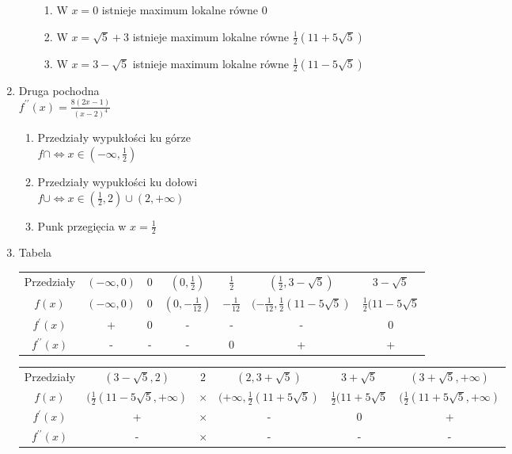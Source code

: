 \documentclass[11pt]{scrartcl}
\begin{document}
\begin{enumerate}
\begin{enumerate}
\begin{enumerate}
					\item W $ x = 0 $ istnieje maximum lokalne równe $ 0 $
					\item W $ x = \sqrt{5} + 3 $ istnieje maximum lokalne równe $ \frac{1}{2}(11 + 5\sqrt{5}) $
					\item W $ x = 3 - \sqrt{5} $ istnieje maximum lokalne równe $ \frac{1}{2}(11 - 5\sqrt{5}) $
				\end{enumerate}
			\end{enumerate}
		\item Druga pochodna \\
			$ f^{\prime\prime}(x) = \frac{8(2x-1)}{(x-2)^4} $
			\begin{enumerate}
				\item Przedziały wypukłości ku górze \\
				$ f\cap \Leftrightarrow x \in (-\infty, \frac{1}{2}) $
				\item Przedziały wypukłości ku dołowi \\
				$ f\cup \Leftrightarrow x \in (\frac{1}{2},2) \cup (2, +\infty) $
				\item Punk przegięcia w $ x = \frac{1}{2} $
			\end{enumerate}
		\item Tabela \\
			\begin{center}
				\begin{tabular}{ |c|c|c|c|c|c|c| } 
					\hline
					Przedziały &
					$ (-\infty, 0) $ &
						$ 0 $ & 
						$ (0,\frac{1}{2}) $ &
						$ \frac{1}{2} $ &
						$ (\frac{1}{2} , 3 - \sqrt{5}) $ &
						$ 3 - \sqrt{5} $ \\
					$ f(x) $ &
						$ (-\infty, 0) $ &
						$ 0 $ &
						$ (0, - \frac{1}{12}) $ &
						$ - \frac{1}{12} $ &
						$ (- \frac{1}{12}, \frac{1}{2}(11 - 5\sqrt{5} ) $ &
						$ \frac{1}{2}(11 - 5\sqrt{5} $ \\
					$ f^{\prime}(x) $ &
						+ &
						0 &
						- &
						- &
						- &
						0 \\
					$ f^{\prime\prime}(x) $ &
						- &
						- &
						- &
						0 &
						+ &
						+ \\
					\hline
				\end{tabular}
				\begin{tabular}{ |c|c|c|c|c|c| } 
					\hline
					Przedziały &
						$ (3 - \sqrt{5}, 2) $ &
						$ 2 $ & 
						$ (2 , 3 + \sqrt{5}) $ &
						$ 3 + \sqrt{5} $ &
						$ (3 + \sqrt{5}, +\infty) $\\
					$ f(x) $ &
						$ (\frac{1}{2}(11 - 5\sqrt{5}, +\infty) $ &
						$ \times $ &
						$ (+\infty, \frac{1}{2}(11 + 5\sqrt{5}) $ &
						$\frac{1}{2}(11 + 5\sqrt{5}  $ &
						$ (\frac{1}{2}(11 + 5\sqrt{5}, +\infty) $\\
					$ f^{\prime}(x) $ &
						+ &
						$ \times $ &
						- &
						0 &
						+ \\
					$ f^{\prime\prime}(x) $ &
						- &
						$ \times$  &
						- &
						- &
						- \\
					\hline
				\end{tabular}
			\end{center}
	\end{enumerate}
\end{document}
